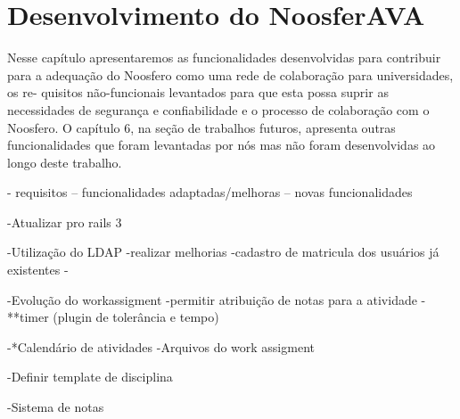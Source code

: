 \section{Desenvolvimento do NoosferAVA}
\label{desen-noosferAVA}

Nesse capítulo apresentaremos as funcionalidades desenvolvidas para contribuir
para a adequação do Noosfero como uma rede de colaboração para universidades, os re-
quisitos não-funcionais levantados para que esta possa suprir as necessidades de segurança
e confiabilidade e o processo de colaboração com o Noosfero. O capítulo 6, na seção de
trabalhos futuros, apresenta outras funcionalidades que foram levantadas por nós mas não
foram desenvolvidas ao longo deste trabalho.

- requisitos
-- funcionalidades adaptadas/melhoras
-- novas funcionalidades

-Atualizar pro rails 3

-Utilização do LDAP
	-realizar melhorias
		-cadastro de matricula dos usuários já existentes
		-

-Evolução do workassigment
	-permitir atribuição de notas para a atividade
	-**timer (plugin de tolerância e tempo)

-*Calendário de atividades
	-Arquivos do work assigment

-Definir template de disciplina

-Sistema de notas